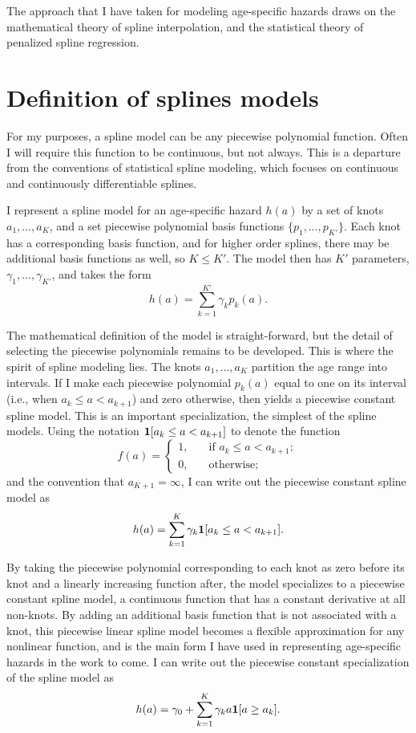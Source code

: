 The approach that I have taken for modeling age-specific hazards draws
on the mathematical theory of spline interpolation, and the
statistical theory of penalized spline regression.


\section{Definition of splines models}

For my purposes, a spline model can be any piecewise polynomial
function.  Often I will require this function to be continuous, but
not always.  This is a departure from the conventions of statistical
spline modeling, which focuses on continuous and continuously
differentiable splines.

I represent a spline model for an age-specific hazard $h(a)$ by a set
of knots $a_1,\dots,a_{K}$, and a set piecewise polynomial basis
functions $\{p_1,\ldots,p_{K'}\}$.  Each knot has a corresponding
basis function, and for higher order splines, there may be additional
basis functions as well, so $K \leq K'$.  The model then has $K'$
parameters, $\gamma_1,\ldots,\gamma_{K'}$, and takes the form
\[
h(a) = \sum_{k=1}^{K'} \gamma_k p_k(a).
\]

The mathematical definition of the model is straight-forward, but the
detail of selecting the piecewise polynomials remains to be developed.
This is where the spirit of spline modeling lies. The knots $a_1,
\dots, a_{K}$ partition the age range into intervals. If I make each
piecewise polynomial $p_k(a)$ equal to one on its interval (i.e., when
$a_k \leq a < a_{k+1}$) and zero otherwise, then yields a piecewise
constant spline model.  This is an important specialization, the
simplest of the spline models.  Using the notation $\mathbf{1}[a_k \leq a <
  a_{k+1}]$ to denote the function 
\[f(a)
= \begin{cases}1,&\quad\text{if }a_k \leq a <
  a_{k+1};\\0,&\quad\text{otherwise;}\end{cases}
\]
 and the convention
that $a_{K+1} = \infty$, I can write out the piecewise constant spline
model as
\[
h(a) = \sum_{k=1}^K \gamma_k \mathbf{1}[a_k \leq a < a_{k+1}].
\]

By taking the piecewise polynomial corresponding to each knot as zero
before its knot and a linearly increasing function after, the model
specializes to a piecewise constant spline model, a continuous
function that has a constant derivative at all non-knots.  By adding
an additional basis function that is not associated with a knot, this
piecewise linear spline model becomes a flexible approximation for any
nonlinear function, and is the main form I have used in representing
age-specific hazards in the work to come.  I can write out the
piecewise constant specialization of the spline model as
\[
h(a) = \gamma_0 + \sum_{k=1}^K \gamma_k a \mathbf{1}[a \geq a_k].
\]

